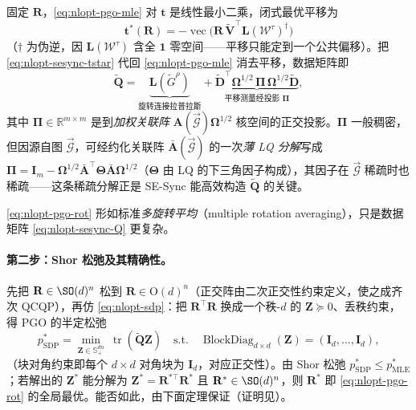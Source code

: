 \begin{derivation}
固定 $\mathbf{R}$，\cref{eq:nlopt-pgo-mle} 对 $\mathbf{t}$ 是线性最小二乘，闭式最优平移为
\begin{equation}
  \mathbf{t}^*(\mathbf{R})=-\operatorname{vec}\!\big(\mathbf{R}\,\tilde{\mathbf{V}}^\top\mathbf{L}(\mathcal{W}^\tau)^\dagger\big)
  \label{eq:nlopt-sesync-tstar}
\end{equation}
（$\dagger$ 为伪逆，因 $\mathbf{L}(\mathcal{W}^\tau)$ 含全 $\mathbf{1}$ 零空间——平移只能定到一个公共偏移）。把 \cref{eq:nlopt-sesync-tstar} 代回 \cref{eq:nlopt-pgo-mle} 消去平移，数据矩阵即
\begin{equation}
  \tilde{\mathbf{Q}}=\underbrace{\mathbf{L}(\tilde{G}^\rho)}_{\text{旋转连接拉普拉斯}}+\underbrace{\tilde{\mathbf{D}}^\top\boldsymbol{\Omega}^{1/2}\,\boldsymbol{\Pi}\,\boldsymbol{\Omega}^{1/2}\tilde{\mathbf{D}}}_{\text{平移测量经投影 }\boldsymbol{\Pi}},
  \label{eq:nlopt-sesync-Q}
\end{equation}
其中 $\boldsymbol{\Pi}\in\mathbb{R}^{m\times m}$ 是到\emph{加权关联阵} $\mathbf{A}(\overrightarrow{\mathcal{G}})\boldsymbol{\Omega}^{1/2}$ 核空间的正交投影。$\boldsymbol{\Pi}$ 一般稠密，但因源自图 $\overrightarrow{\mathcal{G}}$，可经约化关联阵 $\bar{\mathbf{A}}(\overrightarrow{\mathcal{G}})$ 的一次\emph{薄 LQ 分解}写成 $\boldsymbol{\Pi}=\mathbf{I}_m-\boldsymbol{\Omega}^{1/2}\bar{\mathbf{A}}^\top\boldsymbol{\Theta}\bar{\mathbf{A}}\boldsymbol{\Omega}^{1/2}$（$\boldsymbol{\Theta}$ 由 LQ 的下三角因子构成），其因子在 $\overrightarrow{\mathcal{G}}$ 稀疏时也稀疏——这条稀疏分解正是 SE-Sync 能高效构造 $\tilde{\mathbf{Q}}$ 的关键。
\end{derivation}

\noindent \cref{eq:nlopt-pgo-rot} 形如标准\emph{多旋转平均}（multiple rotation averaging），只是数据矩阵 \cref{eq:nlopt-sesync-Q} 更复杂。

\paragraph{第二步：Shor 松弛及其精确性。}\cite{rosen2019sesync}
先把 $\mathbf{R}\in\SO(d)^n$ 松到 $\mathbf{R}\in\mathrm{O}(d)^n$（正交阵由二次正交性约束定义，使之成齐次 QCQP），再仿 \cref{eq:nlopt-sdp}：把 $\mathbf{R}^\top\mathbf{R}$ 换成一个秩-$d$ 的 $\mathbf{Z}\succeq0$、丢秩约束，得 PGO 的半定松弛
\begin{equation}
  p^*_{\mathrm{SDP}}=\min_{\mathbf{Z}\in\mathbb{S}^{dn}_+}\ \operatorname{tr}(\tilde{\mathbf{Q}}\mathbf{Z})
  \quad\text{s.t.}\quad \operatorname{BlockDiag}_{d\times d}(\mathbf{Z})=(\mathbf{I}_d,\dots,\mathbf{I}_d),
  \label{eq:nlopt-pgo-sdp}
\end{equation}
（块对角约束即每个 $d\times d$ 对角块为 $\mathbf{I}_d$，对应正交性）。由 Shor 松弛 $p^*_{\mathrm{SDP}}\le p^*_{\mathrm{MLE}}$；若解出的 $\mathbf{Z}^*$ 能分解为 $\mathbf{Z}^*=\mathbf{R}^{*\top}\mathbf{R}^*$ 且 $\mathbf{R}^*\in\SO(d)^n$，则 $\mathbf{R}^*$ 即 \cref{eq:nlopt-pgo-rot} 的全局最优。能否如此，由下面定理保证（证明见\cite{rosen2019sesync}）。

